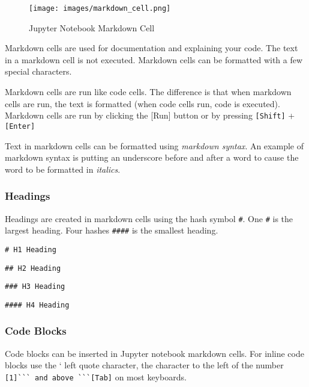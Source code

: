 \documentclass{book}
\makeatletter
\def\maxwidth{\ifdim\Gin@nat@width>\linewidth\linewidth
\else\Gin@nat@width\fi}
\let\Oldincludegraphics\includegraphics
\renewcommand{\includegraphics}[1]{\Oldincludegraphics[width=.8\maxwidth]{#1}}
\newcommand{\passthrough}[1]{#1}
\makeatother
\begin{document}
\begin{figure}
\centering
\texttt{[image: images/markdown\_cell.png]}
\caption{Jupyter Notebook Markdown Cell}
\end{figure}

Markdown cells are used for documentation and explaining your code. The
text in a markdown cell is not executed. Markdown cells can be formatted
with a few special characters.

Markdown cells are run like code cells. The difference is that when
markdown cells are run, the text is formatted (when code cells run, code
is executed). Markdown cells are run by clicking the {[}Run{]} button or
by pressing \passthrough{\lstinline![Shift]!} +
\passthrough{\lstinline![Enter]!}

Text in markdown cells can be formatted using \emph{markdown syntax}. An
example of markdown syntax is putting an underscore before and after a
word to cause the word to be formatted in \emph{italics}.

\hypertarget{headings}{%
\subsubsection{Headings}\label{headings}}

Headings are created in markdown cells using the hash symbol
\passthrough{\lstinline!#!}. One \passthrough{\lstinline!#!} is the
largest heading. Four hashes \passthrough{\lstinline!####!} is the
smallest heading.

\begin{lstlisting}
# H1 Heading
\end{lstlisting}

\begin{lstlisting}
## H2 Heading
\end{lstlisting}

\begin{lstlisting}
### H3 Heading
\end{lstlisting}

\begin{lstlisting}
#### H4 Heading
\end{lstlisting}

\hypertarget{code-blocks}{%
\subsubsection{Code Blocks}\label{code-blocks}}

Code blocks can be inserted in Jupyter notebook markdown cells. For
inline code blocks use the ` left quote character, the character to the
left of the number \passthrough{\lstinline![1]``` and above ```[Tab]!}
on most keyboards.
\end{document}
